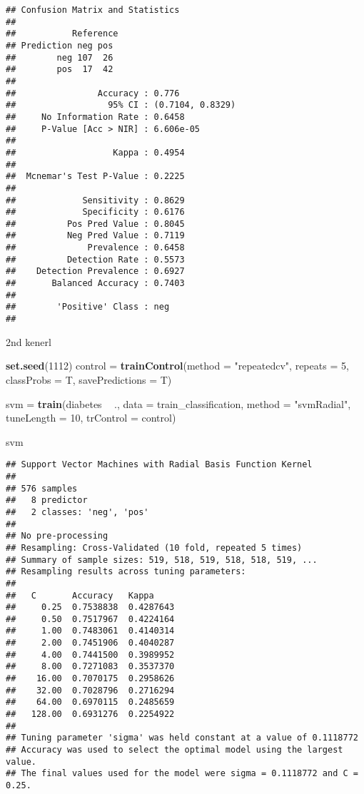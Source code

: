\documentclass[]{article}
\newenvironment{Shaded}{\begin{snugshade}}{\end{snugshade}}
\newcommand{\DataTypeTok}[1]{\textcolor[rgb]{0.13,0.29,0.53}{#1}}
\newcommand{\DecValTok}[1]{\textcolor[rgb]{0.00,0.00,0.81}{#1}}
\newcommand{\KeywordTok}[1]{\textcolor[rgb]{0.13,0.29,0.53}{\textbf{#1}}}
\newcommand{\NormalTok}[1]{#1}
\newcommand{\OperatorTok}[1]{\textcolor[rgb]{0.81,0.36,0.00}{\textbf{#1}}}
\newcommand{\StringTok}[1]{\textcolor[rgb]{0.31,0.60,0.02}{#1}}
\begin{document}
\begin{verbatim}
## Confusion Matrix and Statistics
## 
##           Reference
## Prediction neg pos
##        neg 107  26
##        pos  17  42
##                                           
##                Accuracy : 0.776           
##                  95% CI : (0.7104, 0.8329)
##     No Information Rate : 0.6458          
##     P-Value [Acc > NIR] : 6.606e-05       
##                                           
##                   Kappa : 0.4954          
##                                           
##  Mcnemar's Test P-Value : 0.2225          
##                                           
##             Sensitivity : 0.8629          
##             Specificity : 0.6176          
##          Pos Pred Value : 0.8045          
##          Neg Pred Value : 0.7119          
##              Prevalence : 0.6458          
##          Detection Rate : 0.5573          
##    Detection Prevalence : 0.6927          
##       Balanced Accuracy : 0.7403          
##                                           
##        'Positive' Class : neg             
## 
\end{verbatim}

2nd kenerl

\begin{Shaded}
\begin{Highlighting}[]
\KeywordTok{set.seed}\NormalTok{(}\DecValTok{1112}\NormalTok{)}
\NormalTok{control =}\StringTok{ }\KeywordTok{trainControl}\NormalTok{(}\DataTypeTok{method =} \StringTok{"repeatedcv"}\NormalTok{, }\DataTypeTok{repeats =} \DecValTok{5}\NormalTok{, }\DataTypeTok{classProbs =}\NormalTok{ T, }\DataTypeTok{savePredictions =}\NormalTok{ T)}

\NormalTok{svm =}\StringTok{ }\KeywordTok{train}\NormalTok{(diabetes }\OperatorTok{~}\StringTok{ }\NormalTok{.,  }\DataTypeTok{data =}\NormalTok{ train_classification, }\DataTypeTok{method =} \StringTok{"svmRadial"}\NormalTok{, }\DataTypeTok{tuneLength =} \DecValTok{10}\NormalTok{, }\DataTypeTok{trControl =}\NormalTok{ control)}

\NormalTok{svm}
\end{Highlighting}
\end{Shaded}

\begin{verbatim}
## Support Vector Machines with Radial Basis Function Kernel 
## 
## 576 samples
##   8 predictor
##   2 classes: 'neg', 'pos' 
## 
## No pre-processing
## Resampling: Cross-Validated (10 fold, repeated 5 times) 
## Summary of sample sizes: 519, 518, 519, 518, 518, 519, ... 
## Resampling results across tuning parameters:
## 
##   C       Accuracy   Kappa    
##     0.25  0.7538838  0.4287643
##     0.50  0.7517967  0.4224164
##     1.00  0.7483061  0.4140314
##     2.00  0.7451906  0.4040287
##     4.00  0.7441500  0.3989952
##     8.00  0.7271083  0.3537370
##    16.00  0.7070175  0.2958626
##    32.00  0.7028796  0.2716294
##    64.00  0.6970115  0.2485659
##   128.00  0.6931276  0.2254922
## 
## Tuning parameter 'sigma' was held constant at a value of 0.1118772
## Accuracy was used to select the optimal model using the largest value.
## The final values used for the model were sigma = 0.1118772 and C = 0.25.
\end{verbatim}
\end{document}
